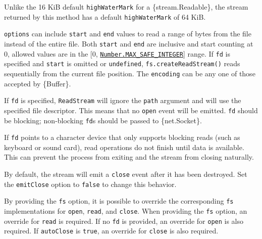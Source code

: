 Unlike the 16 KiB default \texttt{highWaterMark} for a
\{stream.Readable\}, the stream returned by this method has a default
\texttt{highWaterMark} of 64 KiB.

\texttt{options} can include \texttt{start} and \texttt{end} values to
read a range of bytes from the file instead of the entire file. Both
\texttt{start} and \texttt{end} are inclusive and start counting at 0,
allowed values are in the {[}0,
\href{https://developer.mozilla.org/en-US/docs/Web/JavaScript/Reference/Global_Objects/Number/MAX_SAFE_INTEGER}{\texttt{Number.MAX\_SAFE\_INTEGER}}{]}
range. If \texttt{fd} is specified and \texttt{start} is omitted or
\texttt{undefined}, \texttt{fs.createReadStream()} reads sequentially
from the current file position. The \texttt{encoding} can be any one of
those accepted by \{Buffer\}.

If \texttt{fd} is specified, \texttt{ReadStream} will ignore the
\texttt{path} argument and will use the specified file descriptor. This
means that no \texttt{\textquotesingle{}open\textquotesingle{}} event
will be emitted. \texttt{fd} should be blocking; non-blocking
\texttt{fd}s should be passed to \{net.Socket\}.

If \texttt{fd} points to a character device that only supports blocking
reads (such as keyboard or sound card), read operations do not finish
until data is available. This can prevent the process from exiting and
the stream from closing naturally.

By default, the stream will emit a
\texttt{\textquotesingle{}close\textquotesingle{}} event after it has
been destroyed. Set the \texttt{emitClose} option to \texttt{false} to
change this behavior.

By providing the \texttt{fs} option, it is possible to override the
corresponding \texttt{fs} implementations for \texttt{open},
\texttt{read}, and \texttt{close}. When providing the \texttt{fs}
option, an override for \texttt{read} is required. If no \texttt{fd} is
provided, an override for \texttt{open} is also required. If
\texttt{autoClose} is \texttt{true}, an override for \texttt{close} is
also required.

